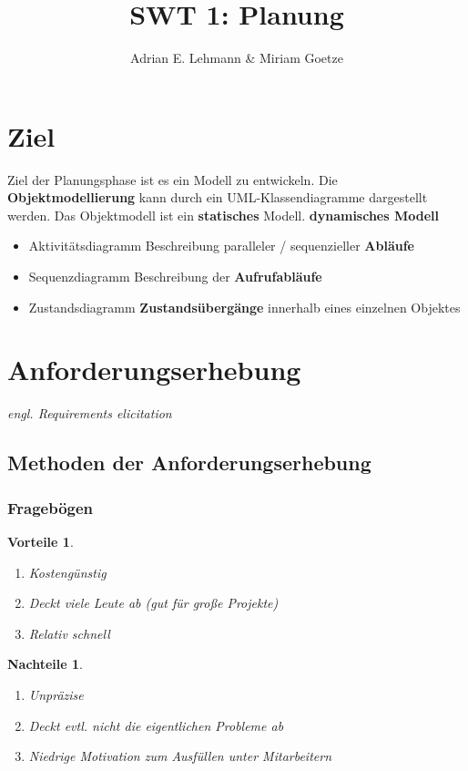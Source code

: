 \documentclass[a4paper]{article}
\title{SWT 1: Planung}
\author{Adrian E. Lehmann \& Miriam Goetze}
\theoremstyle{break}
\newtheorem{why}{Vorteile}[section]
\newtheorem{whynot}{Nachteile}[section]
\begin{document}
	\maketitle
	\tableofcontents
	\newpage

\section{Ziel}

Ziel der Planungsphase ist es ein Modell zu entwickeln. Die \textbf{Objektmodellierung} kann durch ein UML-Klassendiagramme dargestellt werden. Das Objektmodell ist ein \textbf{statisches} Modell.  \textbf{dynamisches Modell} 
\begin{itemize}
	\item Aktivitätsdiagramm
	\subitem Beschreibung paralleler / sequenzieller \textbf{Abläufe}
	\item Sequenzdiagramm
	\subitem Beschreibung der \textbf{Aufrufabläufe}
	\item Zustandsdiagramm
	\subitem \textbf{Zustandsübergänge} innerhalb eines einzelnen Objektes
\end{itemize}
\section{Anforderungserhebung}
	\textit{engl. Requirements elicitation}
\subsection{Methoden der Anforderungserhebung}	
\subsubsection{Fragebögen}
	\begin{why}
		\begin{enumerate}
			\item Kostengünstig
			\item Deckt viele Leute ab (gut für große Projekte)
			\item Relativ schnell
		\end{enumerate}
	\end{why}
	\begin{whynot}
		\begin{enumerate}
			\item Unpräzise
			\item Deckt evtl. nicht die eigentlichen Probleme ab
			\item Niedrige Motivation zum Ausfüllen unter Mitarbeitern
		\end{enumerate}
	\end{whynot}
\end{document}
